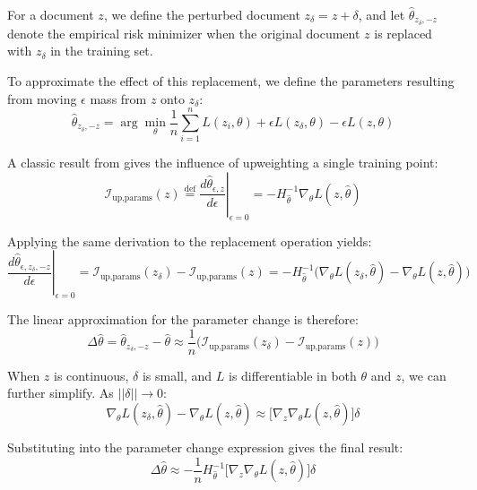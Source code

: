 \documentclass{article} %
\begin{document}
For a document $z$, we define the perturbed document $z_\delta = z + \delta$, and let $\hat{\theta}_{z_\delta,-z}$ denote the empirical risk minimizer when the original document $z$ is replaced with $z_\delta$ in the training set.

To approximate the effect of this replacement, we define the parameters resulting from moving $\epsilon$ mass from $z$ onto $z_\delta$:
\begin{equation}
\hat{\theta}_{z_\delta,-z} = \arg \min_{\theta} \frac{1}{n} \sum^n_{i = 1} L(z_i, \theta) + \epsilon L(z_\delta, \theta) - \epsilon L (z,\theta)
\label{eq:pert1}
\end{equation}

A classic result from \citet{cook1982residuals} gives the influence of upweighting a single training point:
\begin{equation}
\mathcal{I}_{\text{up,params}}(z) \overset{\text{def}}{=} \left. \frac{d\hat{\theta}_{\epsilon,z}}{d\epsilon} \right|_{\epsilon=0} = - H_{\hat{\theta}}^{-1} \nabla_{\theta} L(z, \hat{\theta})
\end{equation}

Applying the same derivation to the replacement operation yields:
\begin{equation}
\left.\frac{d\hat{\theta}_{\epsilon,z_\delta, -z}}{d\epsilon} \right|_{\epsilon=0} =\mathcal{I}_{\text{up,params}}(z_\delta) - \mathcal{I}_{\text{up,params}}(z) =  - H_{\hat{\theta}}^{-1} \big(\nabla_{\theta} L(z_\delta, \hat{\theta})-\nabla_{\theta} L(z, \hat{\theta})\big)
\end{equation}

The linear approximation for the parameter change is therefore:
\begin{equation}
    \Delta\hat\theta = \hat\theta_{z_\delta,-z} - \hat\theta \approx \frac{1}{n} \big(\mathcal{I}_{\text{up,params}}(z_\delta) - \mathcal{I}_{\text{up,params}}(z) \big)
    \label{eq:thetahat}
\end{equation}

When $z$ is continuous, $\delta$ is small, and $L$ is differentiable in both $\theta$ and $z$, we can further simplify. As $||\delta|| \rightarrow 0$:
\begin{equation}
\nabla_{\theta} L(z_\delta, \hat{\theta})-\nabla_{\theta} L(z, \hat{\theta}) \approx \big[ \nabla_z \nabla_\theta L(z, \hat\theta)\big]\delta
\end{equation}

Substituting into the parameter change expression gives the final result:
\begin{equation}
\Delta\hat\theta \approx -\frac{1}{n} H_{\hat{\theta}}^{-1} \big[ \nabla_z \nabla_\theta L(z, \hat\theta)\big]\delta
\end{equation}
\end{document}
